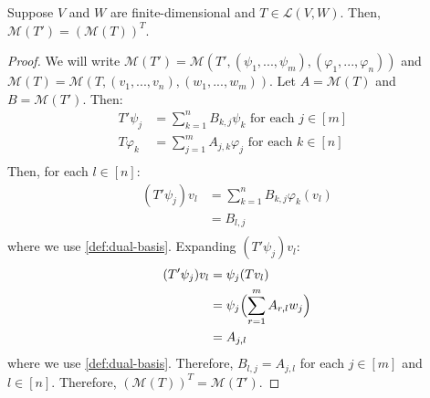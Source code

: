 \documentclass{article}
\begin{document}
\begin{theorem}
  \label{thm:matrix-T'-transpose-T}
  Suppose $V$ and $W$ are finite-dimensional and $T \in \mathcal{L}(V,
  W)$. Then, $\mathcal{M}(T') = (\mathcal{M}(T))^T$.
\end{theorem}
\begin{proof}
  We will write $\mathcal{M}(T') = \mathcal{M}(T', (\psi_1, ...,
  \psi_m), (\varphi_1, ..., \varphi_n))$ and $\mathcal{M}(T) =
  \mathcal{M}(T, (v_1, ..., v_n), (w_1, ..., w_m))$.
  Let $A = \mathcal{M}(T)$ and $B = \mathcal{M}(T')$. Then:
  \begin{align*}
    T'\psi_j &= \sum_{k=1}^n B_{k, j} \psi_k \text{ for each $j \in
               [m]$ }\\
    T\varphi_k &= \sum_{j=1}^m A_{j, k} \varphi_j \text{ for each $k \in
    [n]$ } \\
  \end{align*}
  Then, for each $l \in [n]$:
  \begin{align*}
    (T'\psi_j)v_l &= \sum_{k=1}^n B_{k,j} \varphi_k(v_l) \\
                  &= B_{l, j} \\
  \end{align*}
  where we use \cref{def:dual-basis}. Expanding $(T'\psi_j)v_l$:
  \begin{align*}
    (T' \psi_j)v_l &= \psi_j(Tv_l) \\
                   &= \psi_j \Bigl( \sum_{r=1}^m A_{r,l}w_j \Bigr) \\
                   &= A_{j,l} \\
  \end{align*}
  where we use \cref{def:dual-basis}. Therefore, $B_{l, j} = A_{j, l}$
  for each $j \in [m]$ and $l \in [n]$. Therefore, $(\mathcal{M}(T))^T
  = \mathcal{M}(T')$.
\end{proof}
\end{document}
